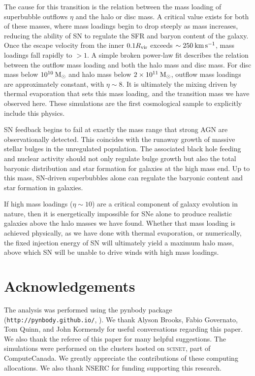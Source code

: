 The cause for this transition is the relation between the mass loading of
superbubble outflows $\eta$ and the halo or disc mass.  A critical value exists
for both of these masses, where mass loadings begin to drop steeply as mass
increases, reducing the ability of SN to regulate the SFR and baryon content of
the galaxy.  Once the escape velocity from the inner $0.1R_{\rm vir}$ exceeds
$\sim250\>{\rm km}\,{\rm s}^{-1}$, mass loadings fall rapidly to $>1$.  A simple broken power-law
fit describes the relation between the outflow mass loading and both the halo
mass and disc mass.  For disc mass below $10^{10}\>{\rm M_{\odot}}$ and halo mass below $2
\times 10^{11}\>{\rm M_{\odot}}$, outflow mass loadings are approximately constant, with
$\eta\sim8$.  It is ultimately the mixing driven by thermal evaporation that
sets this mass loading, and the transition mass we have observed here.  These
simulations are the first cosmological sample to explicitly include this physics.
        
SN feedback begins to fail at exactly the mass range that strong AGN are
observationally detected.  This coincides with the runaway growth of massive
stellar bulges in the unregulated population.  The associated black hole feeding
and nuclear activity should not only regulate bulge growth but also the total baryonic
distribution and star formation for galaxies at the high mass end.  
Up to this mass, SN-driven superbubbles alone can regulate the
baryonic content and star formation in galaxies.

If high mass loadings ($\eta\sim10$) are a critical component of galaxy
evolution in nature, then it is energetically impossible for SNe alone to
produce realistic galaxies above the halo masses we have found.  Whether that
mass loading is achieved physically, as we have done with thermal evaporation,
or numerically, the fixed injection energy of SN will ultimately yield a maximum
halo mass, above which SN will be unable to drive winds with high mass loadings.

\section*{Acknowledgements}
The analysis was performed using the pynbody package
(\texttt{http://pynbody.github.io/}, \citealt{pynbody}).  We thank Alyson Brooks,
Fabio Governato, Tom Quinn, and John Kormendy for useful conversations regarding
this paper.  We also thank the referee of this paper for many helpful
suggestions. The simulations were performed on the clusters hosted on
\textsc{scinet}, part of ComputeCanada.  We greatly appreciate the contributions
of these computing allocations.  We also thank NSERC for funding supporting this
research.


